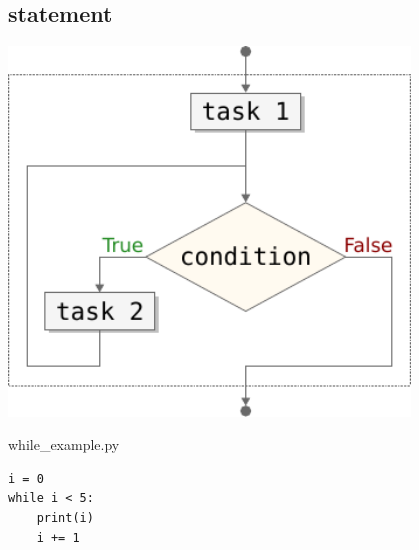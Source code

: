 \documentclass[aspectratio=1610,t]{beamer}
\begin{document}
\subsection{ statement}
\begin{pframe}
 \begin{minipage}{0.47\textwidth}
 \begin{center}
   \includegraphics[width=0.80\textwidth]{../../images/flow_loops.pdf}
 \end{center}
 \end{minipage}%
 \begin{minipage}{0.47\textwidth}
 \begin{pythonfile}{while\_example.py}
  \begin{verbatim}
i = 0
while i < 5:
    print(i)
    i += 1
  \end{verbatim}
 \end{pythonfile}

 \begin{terminal}
 \end{terminal}
 \end{minipage}

\end{pframe}
\end{document}
